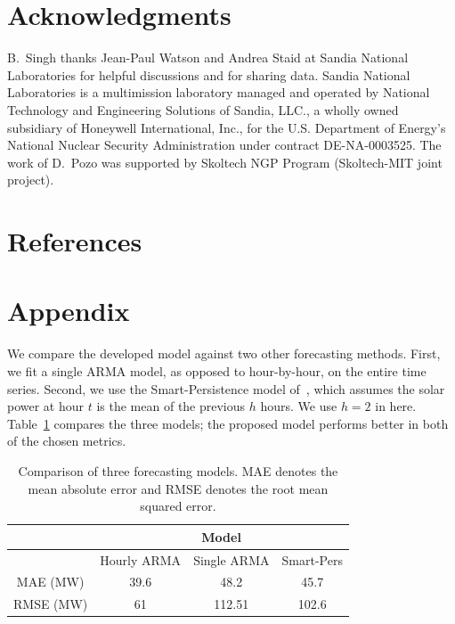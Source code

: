 \documentclass[review]{elsarticle}
\begin{document}
\section*{Acknowledgments} 
B.\ Singh thanks Jean-Paul Watson and Andrea Staid at Sandia National 
Laboratories for helpful discussions and for sharing data. 
Sandia National Laboratories is a multimission laboratory managed and operated 
by National Technology and Engineering Solutions of Sandia, LLC., a wholly owned
subsidiary of Honeywell International, Inc., for the U.S. Department of 
Energy's 
National Nuclear Security Administration under contract DE-NA-0003525.
The work of D.\ Pozo was supported by Skoltech NGP Program (Skoltech-MIT joint 
project).

\section*{References}



\section*{Appendix} \label{sec:appendix}

We compare the developed model against two other forecasting methods. First, we 
fit a single ARMA model, as opposed to hour-by-hour, on the entire time series. 
Second, we use the Smart-Persistence model of~\cite{lauret2016solar}, which 
assumes the solar power at hour $t$ is the mean of the previous $h$ hours. We 
use $h=2$ in here.
Table~\ref{tab:compare} compares the three models; the proposed model performs 
better in both of the chosen metrics. 

\begin{table}[h!]
\centering
\caption{Comparison of three forecasting models. MAE denotes the mean absolute 
error and RMSE denotes the root mean squared error.}
\label{tab:compare}
\begin{tabular}{c|ccc}
\toprule
\multicolumn{1}{l}{} & \multicolumn{3}{c}{Model}              \\ \hline
                     & Hourly ARMA & Single ARMA & Smart-Pers \\ \hline
MAE (MW)                 & 39.6        & 48.2        & 45.7   \\
RMSE (MW)                & 61          & 112.51      & 102.6   \\ \bottomrule
\end{tabular}
\end{table}
\end{document}

